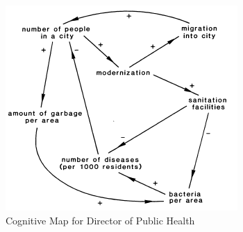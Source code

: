 \documentclass[conference]{IEEEtran}
\begin{document}
\begin{figure}[h]
\includegraphics{CognitiveMap.png}
\caption{Cognitive Map for Director of Public Health}
\label{fig:cm}
\end{figure}
\end{document}
